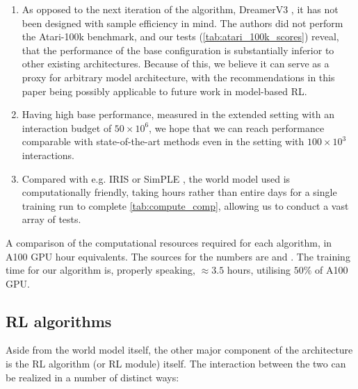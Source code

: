 \documentclass[en]{pracamgr}
\begin{document}
\begin{enumerate}
  \item As opposed to the next iteration of the algorithm, DreamerV3 \autocite{hafnerMasteringDiverseDomains2024}, it has not been designed with sample efficiency in mind. The authors did not perform the Atari-100k benchmark, and our tests (\autoref{tab:atari_100k_scores}) reveal, that the performance of the base configuration is substantially inferior to other existing architectures. Because of this, we believe it can serve as a proxy for arbitrary model architecture, with the recommendations in this paper being possibly applicable to future work in model-based RL.
  \item Having high base performance, measured in the extended setting with an interaction budget of $50 \times 10^6$, we hope that we can reach performance comparable with state-of-the-art methods even in the setting with $100 \times 10^3$ interactions.
  \item Compared with e.g. IRIS \autocite{micheliTransformersAreSampleEfficient2023} or SimPLE \autocite{kaiserModelBasedReinforcementLearning2024}, the world model used is computationally friendly, taking hours rather than entire days for a single training run to complete \autoref{tab:compute_comp}, allowing us to conduct a vast array of tests.
\end{enumerate}

\begin{table}
  \centering
  \begin{adjustbox}{width=1.0\textwidth}
    }
  \end{adjustbox}
  \caption{A comparison of the computational resources required for each algorithm, in A100 GPU hour equivalents. The sources for the numbers are \autocite{hafnerMasteringDiverseDomains2024} and \autocite{schwarzerBiggerBetterFaster2023}. The training time for our algorithm is, properly speaking, $\approx 3.5$ hours, utilising $50\%$ of A100 GPU.}
  \label{tab:compute_comp}
\end{table}

\subsection{RL algorithms}

Aside from the world model itself, the other major component of the architecture is the RL algorithm (or RL module) itself. The interaction between the two can be realized in a number of distinct ways:
\end{document}
